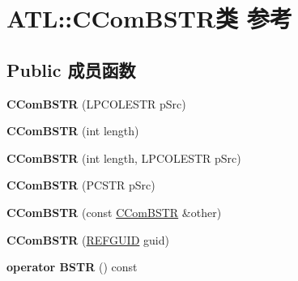 \hypertarget{class_a_t_l_1_1_c_com_b_s_t_r}{}\section{A\+TL\+:\+:C\+Com\+B\+S\+T\+R类 参考}
\label{class_a_t_l_1_1_c_com_b_s_t_r}
\subsection*{Public 成员函数}
\begin{DoxyCompactItemize}
\item 
\mbox{\label{class_a_t_l_1_1_c_com_b_s_t_r_ac1eecabf7553b17689af49f0a20f996f}} 
{\bfseries C\+Com\+B\+S\+TR} (L\+P\+C\+O\+L\+E\+S\+TR p\+Src)
\item 
\mbox{\label{class_a_t_l_1_1_c_com_b_s_t_r_a1a339d1513377eb60a1f78a0255e655d}} 
{\bfseries C\+Com\+B\+S\+TR} (int length)
\item 
\mbox{\label{class_a_t_l_1_1_c_com_b_s_t_r_aa8d8d160aa13d25356e951219a940c4e}} 
{\bfseries C\+Com\+B\+S\+TR} (int length, L\+P\+C\+O\+L\+E\+S\+TR p\+Src)
\item 
\mbox{\label{class_a_t_l_1_1_c_com_b_s_t_r_a434190958c54b0cad07c5d9d3da81dda}} 
{\bfseries C\+Com\+B\+S\+TR} (P\+C\+S\+TR p\+Src)
\item 
\mbox{\label{class_a_t_l_1_1_c_com_b_s_t_r_acadcfced0f7cd90527465a414f9d5b78}} 
{\bfseries C\+Com\+B\+S\+TR} (const \hyperlink{class_a_t_l_1_1_c_com_b_s_t_r}{C\+Com\+B\+S\+TR} \&other)
\item 
\mbox{\label{class_a_t_l_1_1_c_com_b_s_t_r_aebe61285d4335b8af3ed2f8617f7926d}} 
{\bfseries C\+Com\+B\+S\+TR} (\hyperlink{struct___g_u_i_d}{R\+E\+F\+G\+U\+ID} guid)
\item 
\mbox{\label{class_a_t_l_1_1_c_com_b_s_t_r_add1245cfba75e03c44894f2e14fa4d4b}} 
{\bfseries operator B\+S\+TR} () const
\item 
\mbox{\label{class_a_t_l_1_1_c_com_b_s_t_r_a1ed0323ae07bb57265fdc29e2c5f9b88}} 

\end{DoxyCompactItemize}
